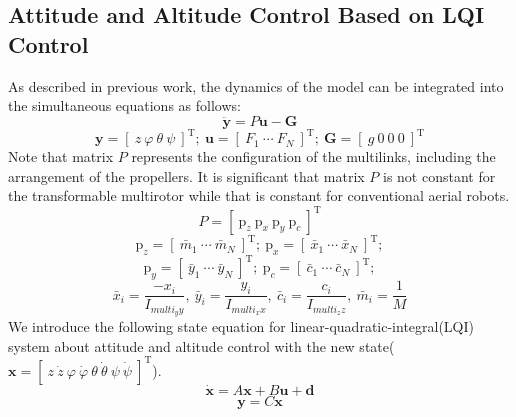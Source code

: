 \subsection{Attitude and Altitude Control Based on LQI Control}
As described in previous work\cite{Zhao2016}, the dynamics of the model can be integrated into the simultaneous equations as follows:
\begin{equation}
  \bm{\ddot{y}} = P\bm{u}-\bm{G}  
\end{equation}
\begin{equation*}
  \bm{y}=[ \ z \ \varphi \ \theta \ \psi \ ]^\mathrm{T}; \ \bm{u}=[ \ F_1 \ \cdots \ F_N \ ]^\mathrm{T}; \ \bm{G}=[ \ g \ 0 \ 0 \ 0 \ ]^\mathrm{T}
\end{equation*}
Note that matrix $P$ represents the configuration of the multilinks, including the arrangement of the propellers. It is significant that matrix $P$ is not constant for the transformable multirotor while that is constant for conventional aerial robots. 
\begin{equation}
  P = [ \ \bm{\mathrm{p}}_z \ \bm{\mathrm{p}}_x \ \bm{\mathrm{p}}_y \ \bm{\mathrm{p}}_c \ ]^\mathrm{T}
  \label{eq:P}
\end{equation}
\begin{equation*}
    \bm{\mathrm{p}}_z=[ \ \bar{m}_1 \ \cdots \ \bar{m}_N \ ]^\mathrm{T}; \ \bm{\mathrm{p}}_x=[ \ \bar{x}_1 \ \cdots \ \bar{x}_N \ ]^\mathrm{T}; 
\end{equation*}
\begin{equation*}
    \bm{\mathrm{p}}_y=[ \ \bar{y}_1 \ \cdots \ \bar{y}_N \ ]^\mathrm{T}; \ \bm{\mathrm{p}}_c=[ \ \bar{c}_1 \ \cdots \ \bar{c}_N \ ]^\mathrm{T};
\end{equation*}
\begin{equation*}
    \bar{x}_i=\frac{-x_i}{I_{multi_yy}}, \ \bar{y}_i=\frac{y_i}{I_{multi_xx}}, \ \bar{c}_i=\frac{c_i}{I_{multi_zz}}, \ \bar{m}_i=\frac{1}{M}
\end{equation*}
We introduce the following state equation for linear-quadratic-integral(LQI) system\cite{Young}
 about attitude and altitude control with the new state($\bm{x}=[ \ z \ \dot{z} \ \varphi \ \dot{\varphi} \ \theta \ \dot{\theta} \ \psi \ \dot{\psi} \ ]^\mathrm{T}$).
\begin{equation}
  \dot{\bm{x}}=A\bm{x}+B\bm{u}+\bm{d}
  \label{eq:state_eq}
\end{equation}
\begin{equation}
  \bm{y}=C\bm{x}
  \label{eq:observation_eq}
\end{equation}
